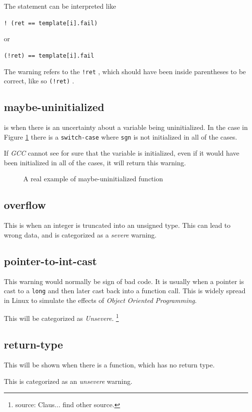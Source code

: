 \documentclass[a4paper,11pt]{report}
\newcommand{\textcode}[1]{
    \fboxsep=1pt
    \texttt{\colorbox{gray!20}{#1}}
}
\newcommand{\figa}{
    \begin{figure}[!htpb]
    \centering
}
\newcommand{\figb}[2]{
    \caption{#1}
    \label{#2}
    \end{figure}
}
\begin{document}
The statement can be interpreted like 
\textcode{! (ret == template[i].fail)} 
or 
\textcode{(!ret) == template[i].fail}


The warning refers to the \textcode{!ret}, which should have been inside 
parentheses to be correct, like so \textcode{(!ret)}.


            \subsection*{maybe-uninitialized}
is when there is an uncertainty about a variable being uninitialized. In the 
case in Figure \ref{lst:maybeuninitializedreal} there is a 
\texttt{switch-case} where \texttt{sgn} is not initialized in all of the cases.

If \emph{GCC} cannot see for sure that the variable is initialized, 
even if it would have been initialized in all of the cases, it will return this 
warning.

\figa
    
\figb{A real example of maybe-uninitialized function}{lst:maybeuninitializedreal}


            \subsection*{overflow}
This is when an integer is truncated into an unsigned type. This can lead to 
wrong data, and is categorized as a \emph{severe} warning.

            \subsection*{pointer-to-int-cast}
            \label{par:pointertoint}
This warning would normally be sign of bad code. It is usually when a pointer 
is cast to a \texttt{long} and then later cast back into a function call. This 
is widely spread in Linux to simulate the effects of \emph{Object Oriented 
Programming}.

This will be categorized as \emph{Unsevere}.
    \footnote{source: Claus... find other source.}


            \subsection*{return-type}
This will be shown when there is a function, which has no return type. 

This is categorized as an \emph{unsevere} warning.
\end{document}
